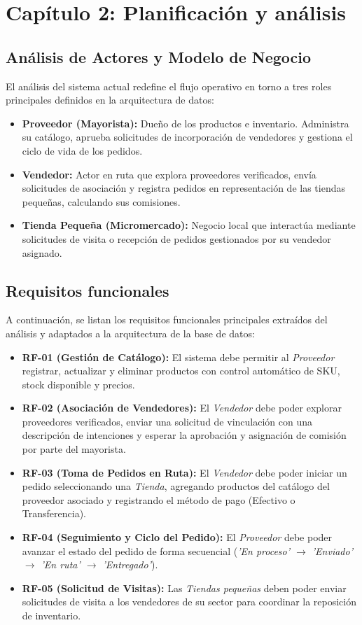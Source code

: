 \documentclass[12pt,a4paper]{report}
\begin{document}
	\chapter{Capítulo 2: Planificación y análisis}
	
	\section{Análisis de Actores y Modelo de Negocio}
	El análisis del sistema actual redefine el flujo operativo en torno a tres roles principales definidos en la arquitectura de datos:
	\begin{itemize}
		\item \textbf{Proveedor (Mayorista):} Dueño de los productos e inventario. Administra su catálogo, aprueba solicitudes de incorporación de vendedores y gestiona el ciclo de vida de los pedidos.
		\item \textbf{Vendedor:} Actor en ruta que explora proveedores verificados, envía solicitudes de asociación y registra pedidos en representación de las tiendas pequeñas, calculando sus comisiones.
		\item \textbf{Tienda Pequeña (Micromercado):} Negocio local que interactúa mediante solicitudes de visita o recepción de pedidos gestionados por su vendedor asignado.
	\end{itemize}
	
	\section{Requisitos funcionales}
	A continuación, se listan los requisitos funcionales principales extraídos del análisis y adaptados a la arquitectura de la base de datos:
	\begin{itemize}
		\item \textbf{RF-01 (Gestión de Catálogo):} El sistema debe permitir al \textit{Proveedor} registrar, actualizar y eliminar productos con control automático de SKU, stock disponible y precios.
		\item \textbf{RF-02 (Asociación de Vendedores):} El \textit{Vendedor} debe poder explorar proveedores verificados, enviar una solicitud de vinculación con una descripción de intenciones y esperar la aprobación y asignación de comisión por parte del mayorista.
		\item \textbf{RF-03 (Toma de Pedidos en Ruta):} El \textit{Vendedor} debe poder iniciar un pedido seleccionando una \textit{Tienda}, agregando productos del catálogo del proveedor asociado y registrando el método de pago (Efectivo o Transferencia).
		\item \textbf{RF-04 (Seguimiento y Ciclo del Pedido):} El \textit{Proveedor} debe poder avanzar el estado del pedido de forma secuencial (\textit{'En proceso' $\rightarrow$ 'Enviado' $\rightarrow$ 'En ruta' $\rightarrow$ 'Entregado'}).
		\item \textbf{RF-05 (Solicitud de Visitas):} Las \textit{Tiendas pequeñas} deben poder enviar solicitudes de visita a los vendedores de su sector para coordinar la reposición de inventario.
	\end{itemize}
	
\end{document}
